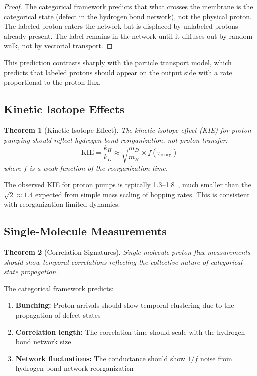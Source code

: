 \documentclass[twocolumn,showpacs,preprintnumbers,amsmath,amssymb,prd]{revtex4-2}
\newtheorem{theorem}{Theorem}[section]
\begin{document}
\begin{proof}
The categorical framework predicts that what crosses the membrane is the categorical state (defect in the hydrogen bond network), not the physical proton. The labeled proton enters the network but is displaced by unlabeled protons already present. The label remains in the network until it diffuses out by random walk, not by vectorial transport.
\end{proof}

This prediction contrasts sharply with the particle transport model, which predicts that labeled protons should appear on the output side with a rate proportional to the proton flux.

\subsection{Kinetic Isotope Effects}

\begin{theorem}[Kinetic Isotope Effect]
\label{thm:kie}
The kinetic isotope effect (KIE) for proton pumping should reflect hydrogen bond reorganization, not proton transfer:
\begin{equation}
\text{KIE} = \frac{k_H}{k_D} \approx \sqrt{\frac{m_D}{m_H}} \times f(\tau_{\text{reorg}})
\label{eq:kie}
\end{equation}
where $f$ is a weak function of the reorganization time.
\end{theorem}

The observed KIE for proton pumps is typically 1.3--1.8~\cite{Wikstrom2015}, much smaller than the $\sqrt{2} \approx 1.4$ expected from simple mass scaling of hopping rates. This is consistent with reorganization-limited dynamics.

\subsection{Single-Molecule Measurements}

\begin{theorem}[Correlation Signatures]
\label{thm:correlations}
Single-molecule proton flux measurements should show temporal correlations reflecting the collective nature of categorical state propagation.
\end{theorem}

The categorical framework predicts:
\begin{enumerate}
\item \textbf{Bunching:} Proton arrivals should show temporal clustering due to the propagation of defect states
\item \textbf{Correlation length:} The correlation time should scale with the hydrogen bond network size
\item \textbf{Network fluctuations:} The conductance should show $1/f$ noise from hydrogen bond network reorganization
\end{enumerate}
\end{document}
